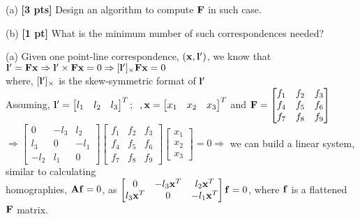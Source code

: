 \documentclass[11pt,addpoints,answers]{exam}
\numberwithin{equation}{section} %
\numberwithin{figure}{section} %
\numberwithin{table}{section} %
\begin{document}
\begin{questions}
(a) \textbf{[3 pts]} Design an algorithm to compute $\mathbf{F}$ in such case. 

(b) \textbf{[1 pt]} What is the minimum number of such correspondences needed?

\begin{tcolorbox}[fit,height=6cm, width=\textwidth, blank, borderline={0.5pt}{-2pt},halign=left, valign=center, nobeforeafter]

(a) Given one point-line correspondence, $(\mathbf{x}, \mathbf{l}')$, we know that $\mathbf{l}' = \mathbf{F} \mathbf{x} \Rightarrow \mathbf{l}' \times \mathbf{F} \mathbf{x} =0 \Rightarrow [\mathbf{l}']_{\times} \mathbf{F} \mathbf{x} =0 $\\
where, $[\mathbf{l}']_{\times}$ is the skew-symmetric format of $\mathbf{l}'$\\
Assuming, $\mathbf{l}' = \begin{bmatrix} l_1& l_2 & l_3 \end{bmatrix}^T; \hspace{0.2cm} , \mathbf{x} = \begin{bmatrix} x_1& x_2 & x_3 \end{bmatrix}^T $ and $\mathbf{F} = \begin{bmatrix} f_1 & f_2 & f_3\\ f_4& f_5&f_6\\f_7&f_8&f_9 \end{bmatrix}  $\\

$\Rightarrow \begin{bmatrix} 0& -l_3&l_2\\ l_3&0&-l_1\\ -l_2&l_1&0 \end{bmatrix}\begin{bmatrix} f_1 & f_2 & f_3\\ f_4& f_5&f_6\\f_7&f_8&f_9 \end{bmatrix} \begin{bmatrix} x_1 \\ x_2 \\ x_3 \end{bmatrix} = 0 \Rightarrow $ we can build a linear system, similar to calculating\\ homographies, $\mathbf{A} \mathbf{f} =0$, as \textcolor{red}{$\begin{bmatrix}0 & -l_3 \mathbf{x}^T & l_2 \mathbf{x}^T \\ l_3 \mathbf{x}^T &0 & -l_1 \mathbf{x}^T \end{bmatrix} \mathbf{f} =0$}, where $\mathbf{f}$ is a flattened $\mathbf{F}$ matrix.\\


\end{tcolorbox}
\end{questions}
\end{document}

